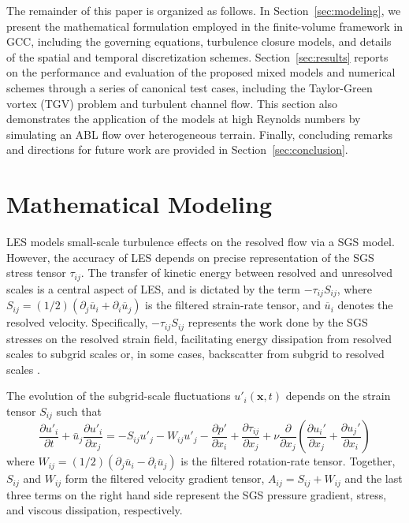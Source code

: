 \documentclass[final,3p]{elsarticle}
\begin{document}
The remainder of this paper is organized as follows. In Section~\ref{sec:modeling}, we present the mathematical formulation employed in the finite-volume framework in GCC, including the governing equations, turbulence closure models, and details of the spatial and temporal discretization schemes. Section~\ref{sec:results} reports on the performance and evaluation of the proposed mixed models and numerical schemes through a series of canonical test cases, including the Taylor-Green vortex (TGV) problem and turbulent channel flow. This section also demonstrates the application of the models at high Reynolds numbers by simulating an ABL flow over heterogeneous terrain. Finally, concluding remarks and directions for future work are provided in Section~\ref{sec:conclusion}.


\section{\label{sec:modeling} Mathematical Modeling}
LES models small-scale turbulence effects on the resolved flow via a SGS model. However, the accuracy of LES depends on precise representation of the SGS stress tensor $\tau_{ij}$. The transfer of kinetic energy between resolved and unresolved scales is a central aspect of LES, and is dictated by the term $-\tau_{ij} S_{ij}$, where $S_{ij} = (1/2)(\partial_j\overline {u}_i + \partial_i\overline{u}_j)$ is the filtered strain-rate tensor, and $\overline{u}_i$ denotes the resolved velocity. Specifically, $-\tau_{ij} S_{ij}$ represents the work done by the SGS stresses on the resolved strain field, facilitating energy dissipation from resolved scales to subgrid scales or, in some cases, backscatter from subgrid to resolved scales \cite{lilly1967, leonard1974, meneveau2000}. 

The evolution of the subgrid-scale fluctuations $u'_i(\bm x,t)$ depends on the strain tensor $S_{ij}$ such that 
%
\begin{equation}
	\label{eq:up}
	\frac{\partial u'_i}{\partial t}  + \bar u_j\frac{\partial u'_i}{\partial x_j} = - S_{ij}u'_j - W_{ij}u'_j - \frac{\partial p'}{\partial x_i} + \frac{\partial \tau_{ij}}{\partial x_j} + \nu \frac{\partial}{\partial x_j} \left(\frac{\partial u_i'}{\partial x_j} + \frac{\partial u_j'}{\partial x_i}\right) 
\end{equation}
where $W_{ij} = (1/2)(\partial_j\overline {u}_i - \partial_i\overline {u}_j)$ is the filtered rotation-rate tensor. Together, \(S_{ij}\) and \(W_{ij}\) form the filtered velocity gradient tensor, \(A_{ij} = S_{ij} + W_{ij}\) and the last three terms on the  right hand side represent the SGS pressure gradient, stress, and viscous dissipation, respectively.
 
\end{document}
